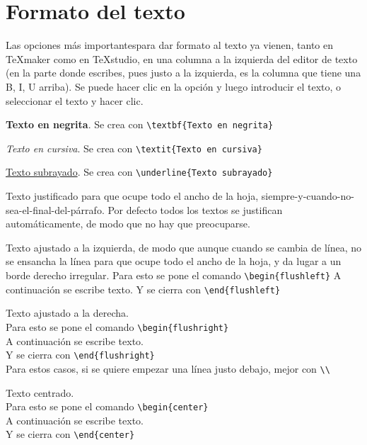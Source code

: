 \chapter{Formato del texto}

Las opciones más importantespara dar formato al texto ya vienen, tanto en TeXmaker como en TeXstudio, en una columna a la izquierda del editor de texto (en la parte donde escribes, pues justo a la izquierda, es la columna que tiene una B, I, U arriba). Se puede hacer clic en la opción y luego introducir el texto, o seleccionar el texto y hacer clic.

\textbf{Texto en negrita}. Se crea con \verb!\textbf{Texto en negrita}!

\textit{Texto en cursiva}. Se crea con \verb!\textit{Texto en cursiva}!

\underline{Texto subrayado}. Se crea con \verb!\underline{Texto subrayado}!

Texto justificado para que ocupe todo el ancho de la hoja, siempre-y-cuando-no-sea-el-final-del-párrafo. Por defecto todos los textos se justifican automáticamente, de modo que no hay que preocuparse.

\begin{flushleft}
	Texto ajustado a la izquierda, de modo que aunque cuando se cambia de línea, no se ensancha la línea para que ocupe todo el ancho de la hoja, y da lugar a un borde derecho irregular. \newline
	Para esto se pone el comando \verb!\begin{flushleft}! \newline
	A continuación se escribe texto. \newline
	Y se cierra con \verb!\end{flushleft}!
\end{flushleft}

\begin{flushright}
	Texto ajustado a la derecha. \\
	Para esto se pone el comando \verb!\begin{flushright}! \\
	A continuación se escribe texto. \\
	Y se cierra con \verb!\end{flushright}! \\
	Para estos casos, si se quiere empezar una línea justo debajo, mejor con \verb!\\!
\end{flushright}

\begin{center}
	Texto centrado.\\
	Para esto se pone el comando \verb!\begin{center}! \\
	A continuación se escribe texto. \\
	Y se cierra con \verb!\end{center}!
\end{center}

